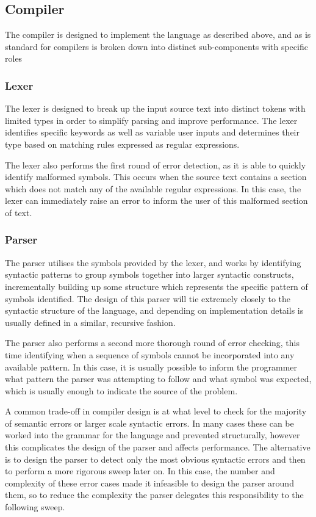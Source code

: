\documentclass[11pt]{article}
\begin{document}
\subsection{Compiler}

The compiler is designed to implement the language as described above, and as is standard for compilers is broken down into distinct sub-components with specific roles

\subsubsection{Lexer}

The lexer is designed to break up the input source text into distinct tokens with limited types in order to simplify parsing and improve performance. The lexer identifies specific keywords as well as variable user inputs and determines their type based on matching rules expressed as regular expressions.

The lexer also performs the first round of error detection, as it is able to quickly identify malformed symbols. This occurs when the source text contains a section which does not match any of the available regular expressions. In this case, the lexer can immediately raise an error to inform the user of this malformed section of text.

\subsubsection{Parser}

The parser utilises the symbols provided by the lexer, and works by identifying syntactic patterns to group symbols together into larger syntactic constructs, incrementally building up some structure which represents the specific pattern of symbols identified. The design of this parser will tie extremely closely to the syntactic structure of the language, and depending on implementation details is usually defined in a similar, recursive fashion.

The parser also performs a second more thorough round of error checking, this time identifying when a sequence of symbols cannot be incorporated into any available pattern. In this case, it is usually possible to inform the programmer what pattern the parser was attempting to follow and what symbol was expected, which is usually enough to indicate the source of the problem.

A common trade-off in compiler design is at what level to check for the majority of semantic errors or larger scale syntactic errors. In many cases these can be worked into the grammar for the language and prevented structurally, however this complicates the design of the parser and affects performance. The alternative is to design the parser to detect only the most obvious syntactic errors and then to perform a more rigorous sweep later on. In this case, the number and complexity of these error cases made it infeasible to design the parser around them, so to reduce the complexity the parser delegates this responsibility to the following sweep.
\end{document}
